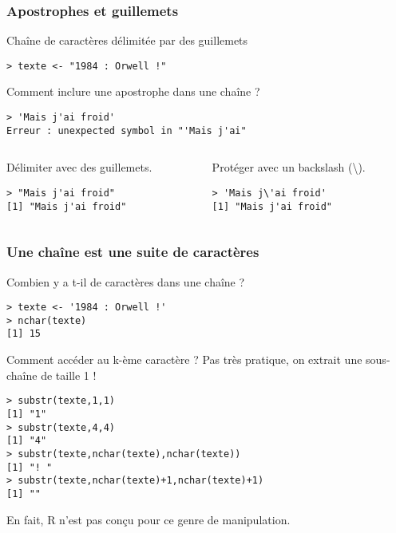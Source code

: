 \documentclass[10pt]{beamer}
\begin{document}
\begin{frame}[fragile]
  \frametitle{Apostrophes et guillemets}
\begin{block}{Chaîne de caractères délimitée par des guillemets}
  \begin{lstlisting}[style=edblock]
> texte <- "1984 : Orwell !"
  \end{lstlisting}
\end{block}

\begin{exampleblock}{Comment inclure une apostrophe dans une chaîne ?}
  \begin{lstlisting}[style=block]
> 'Mais j'ai froid'
Erreur : unexpected symbol in "'Mais j'ai"
\end{lstlisting}
\begin{columns}[t]
  \begin{column}{0.48\textwidth}
    Délimiter avec des guillemets.
  \begin{lstlisting}
> "Mais j'ai froid"
[1] "Mais j'ai froid"
\end{lstlisting}
\end{column}
\begin{column}{0.48\textwidth}
  Protéger avec un backslash (\textbackslash).
  \begin{lstlisting}
> 'Mais j\'ai froid'
[1] "Mais j'ai froid"
\end{lstlisting}
\end{column}
\end{columns}

\end{exampleblock}
\end{frame}


\begin{frame}[fragile]
  \frametitle{Une chaîne est une suite de caractères}
  \begin{block}{Combien y a t-il de caractères dans une chaîne ?}
    \begin{lstlisting}[style=block]
> texte <- '1984 : Orwell !'
> nchar(texte)
[1] 15
    \end{lstlisting}
  \end{block}

  \begin{block}{Comment accéder au k-ème caractère ?}
    Pas très pratique, on extrait une sous-chaîne de taille 1 !
    \begin{lstlisting}[style=block]
> substr(texte,1,1)
[1] "1"
> substr(texte,4,4)
[1] "4"
> substr(texte,nchar(texte),nchar(texte))
[1] "! "
> substr(texte,nchar(texte)+1,nchar(texte)+1)
[1] ""
    \end{lstlisting}
    En fait, R n’est pas conçu pour ce genre de manipulation.
  \end{block}
\end{frame}
\end{document}
